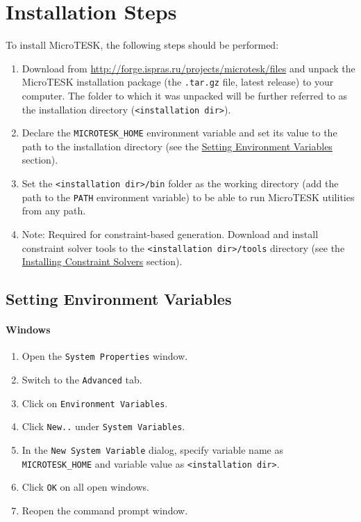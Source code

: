 \documentclass[oneside,final,12pt]{extreport}
\begin{document}
\section{Installation Steps}

To install MicroTESK, the following steps should be performed:

\begin{enumerate}
  \item Download from \url{http://forge.ispras.ru/projects/microtesk/files} and unpack
        the MicroTESK installation package (the \texttt{.tar.gz} file, latest release) to your
        computer. The folder to which it was unpacked will be further referred to as
        the installation directory (\texttt{<installation dir>}).

  \item Declare the \texttt{MICROTESK{\_}HOME} environment variable and set its value to the path to
        the installation directory (see the \hyperref[Setting_Environment_Variables]
        {Setting Environment Variables} section).

  \item Set the \texttt{<installation dir>/bin} folder as the working directory (add the path to
        the \texttt{PATH} environment variable) to be able to run MicroTESK utilities from any path.

  \item Note: Required for constraint-based generation. Download and install constraint
        solver tools to the \texttt{<installation dir>/tools} directory (see the
        \hyperref[Installing_Constraint_Solvers]{Installing Constraint Solvers} section).
\end{enumerate}

\subsection{Setting Environment Variables}
\label{Setting_Environment_Variables}

\paragraph{Windows}

\begin{enumerate}
  \item Open the \texttt{System Properties} window.
  \item Switch to the \texttt{Advanced} tab.
  \item Click on \texttt{Environment Variables}.
  \item Click \texttt{New..} under \texttt{System Variables}.
  \item In the \texttt{New System Variable} dialog, specify variable name as
        \texttt{MICROTESK{\_}HOME} and variable value as \texttt{<installation dir>}.
  \item Click \texttt{OK} on all open windows.
  \item Reopen the command prompt window.
\end{enumerate}
\end{document}
